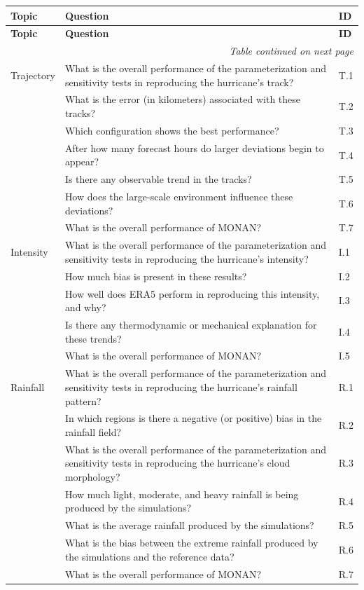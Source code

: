 \begin{longtable}{p{2.5cm} p{10cm} p{1.5cm}}
\textbf{Topic} & \textbf{Question} & \textbf{ID} \\
\hline
\endfirsthead

\textbf{Topic} & \textbf{Question} & \textbf{ID} \\
\hline
\endhead

\multicolumn{3}{r}{\textit{Table continued on next page}} \\
\endfoot

\hline
\endlastfoot

Trajectory & What is the overall performance of the parameterization and sensitivity tests in reproducing the hurricane's track? & T.1 \\
& What is the error (in kilometers) associated with these tracks? & T.2 \\
& Which configuration shows the best performance? & T.3 \\
& After how many forecast hours do larger deviations begin to appear? & T.4 \\
& Is there any observable trend in the tracks? & T.5 \\
& How does the large-scale environment influence these deviations? & T.6 \\
& What is the overall performance of MONAN? & T.7 \\
\hline
Intensity & What is the overall performance of the parameterization and sensitivity tests in reproducing the hurricane's intensity? & I.1 \\
& How much bias is present in these results? & I.2 \\
& How well does ERA5 perform in reproducing this intensity, and why? & I.3 \\
& Is there any thermodynamic or mechanical explanation for these trends? & I.4 \\
& What is the overall performance of MONAN? & I.5 \\
\hline
Rainfall & What is the overall performance of the parameterization and sensitivity tests in reproducing the hurricane’s rainfall pattern? & R.1 \\
& In which regions is there a negative (or positive) bias in the rainfall field? & R.2 \\
& What is the overall performance of the parameterization and sensitivity tests in reproducing the hurricane’s cloud morphology? & R.3 \\
& How much light, moderate, and heavy rainfall is being produced by the simulations? & R.4 \\
& What is the average rainfall produced by the simulations? & R.5 \\
& What is the bias between the extreme rainfall produced by the simulations and the reference data? & R.6 \\
& What is the overall performance of MONAN? & R.7 \\
\end{longtable}

